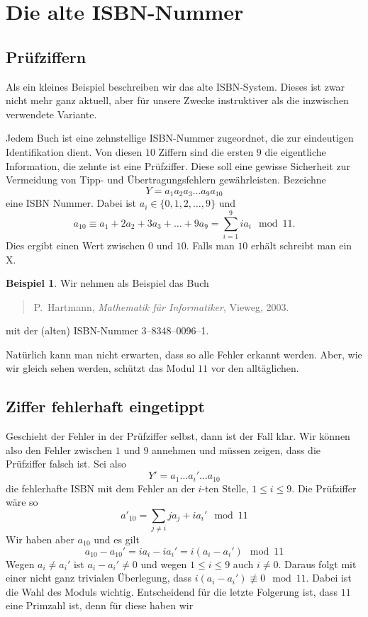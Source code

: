 \documentclass[%
11pt,%
twoside,%
titlepage,%
swissgerman,%
headsepline%
]{scrartcl}
\theoremstyle{definition}
\newtheorem{bsp}{Beispiel}[subsection] %
\theoremstyle{plain}
\begin{document}
\clearpage

\section{Die alte ISBN-Nummer}
\subsection{Prüfziffern}

Als ein kleines Beispiel beschreiben wir das alte ISBN-System. Dieses ist zwar nicht mehr ganz aktuell, aber für unsere Zwecke instruktiver als die inzwischen verwendete Variante.

Jedem Buch ist eine zehnstellige ISBN-Nummer zugeordnet, die zur eindeutigen Identifikation dient. Von diesen $10$ Ziffern sind die ersten $9$ die eigentliche Information, die zehnte ist eine Prüfziffer. Diese soll eine gewisse Sicherheit zur Vermeidung von Tipp- und Übertragungsfehlern gewährleisten.
Bezeichne
$$Y=a_1a_2a_3\dots a_9a_{10}$$
eine ISBN Nummer. Dabei ist $a_i\in\{0,1,2,\dots,9\}$ und
$$a_{10}\equiv a_1+2a_2+3a_3+\dots+9a_9=\sum_{i=1}^9ia_i\mod11.$$
Dies ergibt einen Wert zwischen $0$ und $10$. Falls man $10$ erhält schreibt man ein X.

\begin{bsp}
Wir nehmen als Beispiel das Buch
\begin{quote}
P.~Hartmann, \emph{Mathematik für Informatiker}, Vieweg, 2003.
\end{quote}
mit der (alten) ISBN-Nummer 3--8348--0096--1.
\end{bsp}

Natürlich kann man nicht erwarten, dass so alle Fehler erkannt werden. Aber, wie wir gleich sehen werden, schützt das Modul $11$ vor den alltäglichen.

\subsection{Ziffer fehlerhaft eingetippt}

Geschieht der Fehler in der Prüfziffer selbst, dann ist der Fall klar. Wir können also den Fehler zwischen $1$ und $9$ annehmen und müssen zeigen, dass die Prüfziffer falsch ist. Sei also
$$Y'=a_1\dots a_i'\dots a_{10}$$
die fehlerhafte ISBN mit dem Fehler an der $i$-ten Stelle, $1\leq i\leq9$. Die Prüfziffer wäre so
$$a'_{10}=\sum_{j\neq i}ja_j+ia_i'\mod11$$
Wir haben aber $a_{10}$ und es gilt
$$a_{10}-a_{10}'=ia_i-ia_i'=i(a_i-a_i')\mod11$$
Wegen $a_i\neq a_i'$ ist $a_i-a_i'\neq0$ und wegen $1\leq i\leq9$ auch $i\neq0$. Daraus folgt mit einer nicht ganz trivialen Überlegung, dass $i(a_i-a_i')\not\equiv0\mod11$. Dabei ist die Wahl des Moduls wichtig. Entscheidend für die letzte Folgerung ist, dass $11$ eine Primzahl ist, denn für diese haben wir
\end{document}
